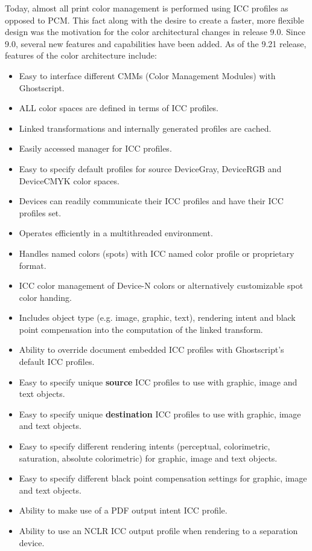 \documentclass[12pt,notitlepage]{article}
\begin{document}
Today, almost all print color management is performed using ICC profiles as opposed to PCM.  This fact along with the desire to create a faster, more flexible design was the motivation for the color architectural changes in release 9.0.  Since 9.0, several new features and capabilities  have been added. As of the 9.21 release, features of the color architecture include:
\begin{itemize}
\item Easy to interface different CMMs (Color Management Modules) with Ghostscript.
\item ALL color spaces are defined in terms of ICC profiles.
\item Linked transformations and internally generated profiles are cached.
\item Easily accessed manager for ICC profiles.
\item Easy to specify default profiles for source DeviceGray, DeviceRGB and DeviceCMYK color spaces.
\item Devices can readily communicate their ICC profiles and have their ICC profiles set.
\item Operates efficiently in a multithreaded environment.
\item Handles named colors (spots) with ICC named color profile or proprietary format.
\item ICC color management of Device-N colors or alternatively customizable spot color handing.
\item Includes object type (e.g. image, graphic, text), rendering intent and black point compensation into the computation of the linked transform.
\item Ability to override document embedded ICC profiles with Ghostscript's default ICC profiles.
\item Easy to specify unique {\bf source} ICC profiles to use with graphic, image and text objects.
\item Easy to specify unique {\bf destination} ICC profiles to use with graphic, image and text objects.
\item Easy to specify different rendering intents (perceptual, colorimetric, saturation, absolute colorimetric) for graphic, image and text objects.
\item Easy to specify different black point compensation settings for graphic, image and text objects.
\item Ability to make use of a PDF output intent ICC profile.
\item Ability to use an NCLR ICC output profile when rendering to a separation device.

\end{itemize}
\end{document}
